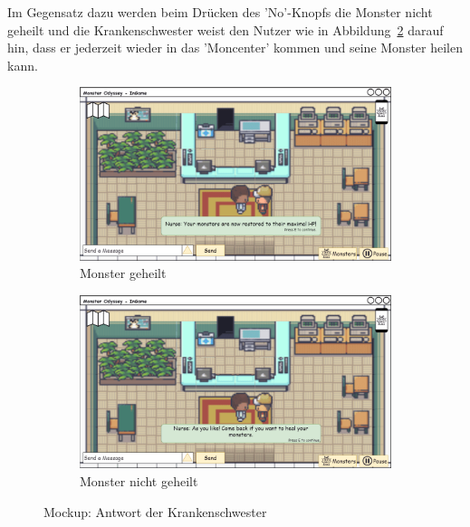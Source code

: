 Im Gegensatz dazu werden beim Drücken des 'No'-Knopfs die Monster nicht geheilt und die Krankenschwester weist den Nutzer wie in Abbildung~\ref{fig: Monster nicht geheilt} darauf hin, dass er jederzeit wieder in das 'Moncenter' kommen und seine Monster heilen kann.
\begin{figure}[H]
    \centering
    \begin{subfigure}[b]{0.4\textwidth}
        \includegraphics[width=\textwidth]{images/mockups/Heilung/PlayerInMoncenterHealingHealed.png}
        \caption{Monster geheilt}
        \label{fig: Monster geheilt}
    \end{subfigure}
    \hfill
    \begin{subfigure}[b]{0.4\textwidth}
        \includegraphics[width=\textwidth]{images/mockups/Heilung/PlayerInMoncenterHealingNotHealed.png}
        \caption{Monster nicht geheilt}
        \label{fig: Monster nicht geheilt}
    \end{subfigure}
    \caption{Mockup: Antwort der Krankenschwester}
    \label{fig: Antwort der Krankenschwester}
\end{figure}
